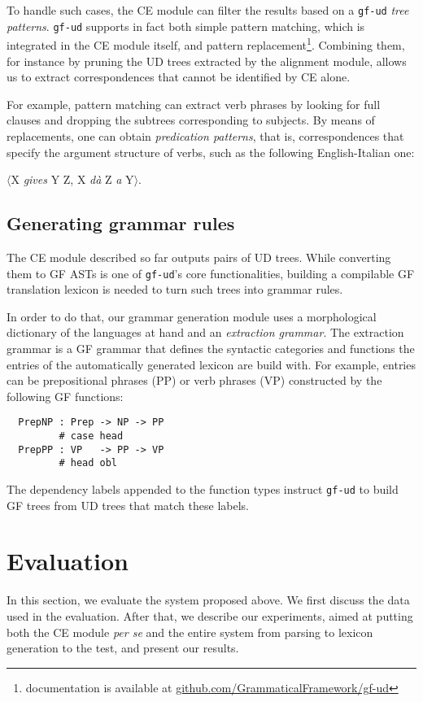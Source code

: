 \documentclass[11pt]{article}
\begin{document}
To handle such cases, the CE module can filter the results based on a \texttt{gf-ud} \textit{tree patterns}.
\texttt{gf-ud} supports in fact both simple pattern matching, which is integrated in the CE module itself, and pattern replacement\footnote{documentation is available at \url{github.com/GrammaticalFramework/gf-ud}}.
Combining them, for instance by pruning the UD trees extracted by the alignment module, allows us to extract correspondences that cannot be identified by CE alone. 

For example, pattern matching can extract verb phrases by looking for full clauses and dropping the subtrees corresponding to subjects. 
By means of replacements, one can obtain \textit{predication patterns}, that is, correspondences that specify the argument structure of verbs, such as the following English-Italian one:

\smallskip
$\langle$X \textit{gives} Y Z, X \textit{dà} Z \textit{a} Y$\rangle$.

\subsection{Generating grammar rules}
The CE module described so far outputs pairs of UD trees. 
While converting them to GF ASTs is one of \texttt{gf-ud}'s core functionalities, building a compilable GF translation lexicon is needed to turn such trees into grammar rules.

In order to do that, our grammar generation module uses a morphological dictionary of the languages at hand and an \textit{extraction grammar}. 
The extraction grammar is a GF grammar that defines the syntactic categories and functions the entries of the automatically generated lexicon are build with.
For example, entries can be prepositional phrases (PP) or verb phrases (VP) constructed by the following GF functions:
\begin{verbatim}
  PrepNP : Prep -> NP -> PP 
         # case head
  PrepPP : VP   -> PP -> VP 
         # head obl
\end{verbatim}
The dependency labels appended to the function types instruct \texttt{gf-ud} to build GF trees from UD trees that match these labels.


\section{Evaluation} \label{evaluation}
In this section, we evaluate the system proposed above. 
We first discuss the data used in the evaluation. 
After that, we describe our experiments, aimed at putting both the CE module \textit{per se} and the entire system from parsing to lexicon generation to the test, and present our results.
\end{document}
